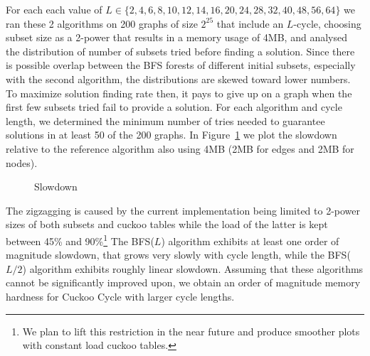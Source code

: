 \documentclass[11pt, oneside]{article}
\begin{document}
For each each value of $L \in \{2,4,6,8,10,12,14,16,20,24,28,32,40,48,56,64\}$ we ran these 2 algorithms
on 200 graphs of size $2^{25}$ that include an $L$-cycle,
choosing subset size as a 2-power that results in a memory usage of 4MB,
and analysed the distribution of number of subsets tried before
finding a solution. Since there is possible overlap between the BFS forests of different initial subsets,
especially with the second algorithm, the distributions are skewed toward lower numbers. To maximize solution
finding rate then, it pays to give up on a graph when the first few subsets tried fail to provide a solution.
For each algorithm and cycle length, we determined the minimum number of tries needed to guarantee solutions
in at least 50 of the 200 graphs. In Figure~\ref{slowdown} we plot the slowdown relative to the reference algorithm also using 4MB
(2MB for edges and 2MB for nodes).

\begin{figure}
\begin{center}
\end{center}
\caption{Slowdown}
\label{slowdown}
\end{figure}

The zigzagging is caused by the current implementation being limited to 2-power sizes of
both subsets and cuckoo tables while the load of the latter is kept between 45\% and 90\%\footnote{We
plan to lift this restriction in the near future and produce smoother plots with constant load cuckoo tables.}
The BFS($L$) algorithm exhibits at least one order of magnitude slowdown, that grows very slowly
with cycle length, while the BFS($L/2$) algorithm exhibits roughly linear slowdown.
Assuming that these algorithms cannot be significantly improved upon, we obtain an order of magnitude
memory hardness for Cuckoo Cycle with larger cycle lengths.
\end{document}
